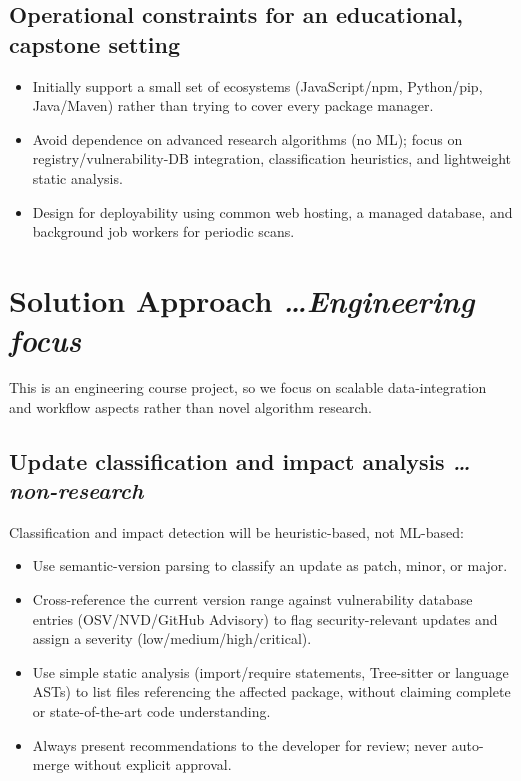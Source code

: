 \documentclass[11pt,a4paper]{article}
\newcommand{\BvrHint}[1]{%
  {\normalfont\normalsize\itshape\hfill #1}}
\begin{document}
\subsection{Operational constraints for an educational, capstone setting}
\begin{itemize}[leftmargin=0.7cm]
    \item Initially support a small set of ecosystems (JavaScript/npm, Python/pip, Java/Maven) rather than trying to cover every package manager.
    \item Avoid dependence on advanced research algorithms (no ML); focus on registry/vulnerability-DB integration, classification heuristics, and lightweight static analysis.
    \item Design for deployability using common web hosting, a managed database, and background job workers for periodic scans.
\end{itemize}

\section{Solution Approach %
\BvrHint{\ldots Engineering focus}}
This is an engineering course project, so we focus on scalable data-integration and workflow aspects rather than novel algorithm research.

\subsection{Update classification and impact analysis %
\BvrHint{\ldots non-research}}
Classification and impact detection will be heuristic-based, not ML-based:
\begin{itemize}[leftmargin=0.7cm]
    \item Use semantic-version parsing to classify an update as patch, minor, or major.
    \item Cross-reference the current version range against vulnerability database entries (OSV/NVD/GitHub Advisory) to flag security-relevant updates and assign a severity (low/medium/high/critical).
    \item Use simple static analysis (import/require statements, Tree-sitter or language ASTs) to list files referencing the affected package, without claiming complete or state-of-the-art code understanding.
    \item Always present recommendations to the developer for review; never auto-merge without explicit approval.
\end{itemize}
\end{document}
